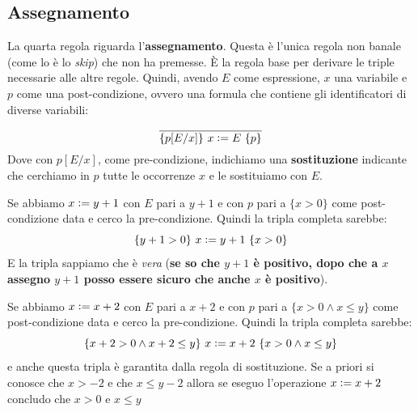 \subsection{Assegnamento}
\begin{definizione}
	La quarta regola riguarda l'\textbf{assegnamento}. Questa è l'unica regola
	non banale (come lo è lo \textit{skip}) che non ha premesse. È la regola base
	per derivare le triple necessarie alle altre regole. Quindi, avendo $E$ come
	espressione, $x$ una variabile e $p$ come una post-condizione, ovvero una
	formula che contiene gli identificatori di diverse variabili:
	\begin{align}\label{AssignmentRule}
		\frac{}{\{p[E/x]\}\,\, x\cceq E\,\,\{p\}} 
	\end{align}
	Dove con $p[E/x]$, come pre-condizione, indichiamo una \textbf{sostituzione} 
	indicante che cerchiamo in $p$ tutte le occorrenze $x$ e le sostituiamo con $E$.
	\begin{esempio}
		Se abbiamo $x \cceq y+1$ con $E$ pari a $y+1$ e con $p$ pari a $\{x>0\}$ come
		post-condizione data e cerco la pre-condizione. Quindi la tripla completa
		sarebbe: 
		\[\{y+1>0\}\,\, x \cceq y+1\,\,\{x>0\}\]
		E la tripla sappiamo che è \emph{vera} (\textbf{se so che $y+1$ è positivo, dopo
		che a $x$ assegno $y+1$ posso essere sicuro che anche $x$ è positivo}).
	\end{esempio}
	\begin{esempio}
		Se abbiamo $x \cceq x+2$ con $E$ pari a $x+2$ e con $p$ pari a $\{x>0\land x\leq
		y\}$ come post-condizione data e cerco la pre-condizione. Quindi la tripla
		completa sarebbe:
		\[\{x+2>0\land x+2\leq y\}\,\, x \cceq x+2\,\,\{x>0\land x\leq y\}\]
		e anche questa tripla è garantita dalla regola di sostituzione.
		Se a priori si conosce che $x>-2$ e che $x \leq y-2$ allora se eseguo l'operazione $x \cceq x+2$ concludo che $x>0$ e $x \leq y$
	\end{esempio}
\end{definizione} \vspace{5mm} %
